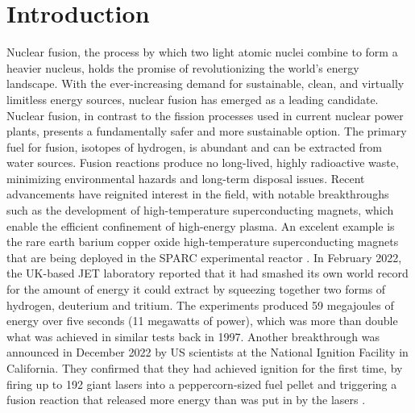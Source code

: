 \chapter{Introduction}
Nuclear fusion, the process by which two light atomic nuclei combine to form a heavier nucleus, holds the promise of revolutionizing the world's energy landscape. With the ever-increasing demand for sustainable, clean, and virtually limitless energy sources, nuclear fusion has emerged as a leading candidate. Nuclear fusion, in contrast to the fission processes used in current nuclear power plants, presents a fundamentally safer and more sustainable option. The primary fuel for fusion, isotopes of hydrogen, is abundant and can be extracted from water sources. Fusion reactions produce no long-lived, highly radioactive waste, minimizing environmental hazards and long-term disposal issues. Recent advancements have reignited interest in the field, with notable breakthroughs such as the development of high-temperature superconducting magnets, which enable the efficient confinement of high-energy plasma. An excelent example is the rare earth barium copper oxide high-temperature superconducting magnets that are being deployed in the SPARC experimental reactor \cite{SPARCoverview}. In February 2022, the UK-based JET laboratory reported that it had smashed its own world record for the amount of energy it could extract by squeezing together two forms of hydrogen, deuterium and tritium. The experiments produced 59 megajoules of energy over five seconds (11 megawatts of power), which was more than double what was achieved in similar tests back in 1997. Another breakthrough was announced in December 2022 by US scientists at the National Ignition Facility in California. They confirmed that they had achieved ignition for the first time, by firing up to 192 giant lasers into a peppercorn-sized fuel pellet and triggering a fusion reaction that released more energy than was put in by the lasers \cite{nationalignitionfacilitycali}.

